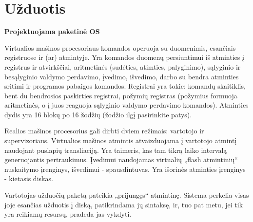 \section{Užduotis}
\textbf{Projektuojama paketinė OS}

Virtualios mašinos procesoriaus komandos operuoja su duomenimis, esančiais registruose ir (ar) atmintyje. Yra komandos duomenų persiuntimui iš atminties į registrus ir atvirkščiai, aritmetinės (sudėties, atimties, palyginimo), sąlyginio ir besąlyginio valdymo perdavimo, įvedimo, išvedimo, darbo su bendra atminties sritimi  ir programos pabaigos komandos. Registrai yra tokie: komandų skaitiklis, bent du bendrosios paskirties registrai, požymių registras (požymius formuoja aritmetinės, o į juos reaguoja sąlyginio valdymo perdavimo komandos). Atminties dydis yra 16 blokų po 16 žodžių (žodžio ilgį pasirinkite patys).

Realios mašinos procesorius gali dirbti dviem režimais: vartotojo ir supervizoriaus. Virtualios mašinos atmintis atvaizduojama į vartotojo atmintį naudojant puslapių transliaciją. Yra taimeris, kas tam tikrą laiko intervalą generuojantis pertraukimus. Įvedimui naudojamas virtualių „flash atmintinių“ nuskaitymo įrenginys, išvedimui - spausdintuvas. Yra išorinės atminties įrenginys - kietasis diskas.

Vartotojas užduočių paketą pateikia „prijungęs“ atmintinę. Sistema perkelia visas joje esančias užduotis į diską, patikrindama jų sintaksę, ir, tuo pat metu, jei tik yra reikiamų resursų, pradeda jas vykdyti.

\newpage

